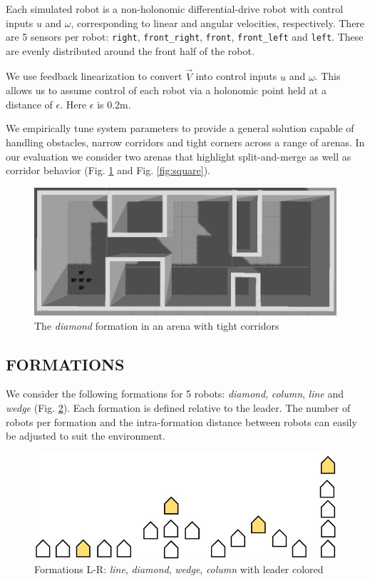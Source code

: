 \documentclass[letterpaper, 10 pt, conference]{ieeeconf}  %
\begin{document}
Each simulated robot is a non-holonomic differential-drive robot with control inputs $u$ and $\omega$, corresponding to linear and angular velocities, respectively. There are 5 sensors per robot: \texttt{right}, \texttt{front\_right}, \texttt{front}, \texttt{front\_left} and \texttt{left}. These are evenly distributed around the front half of the robot.

We use feedback linearization to convert $\vec{V}$ into control inputs $u$ and $\omega$. This allows us to assume control of each robot via a holonomic point held at a distance of $\epsilon$. Here $\epsilon$ is 0.2m.

We empirically tune system parameters to provide a general solution capable of handling obstacles, narrow corridors and tight corners across a range of arenas. In our evaluation we consider two arenas that highlight split-and-merge as well as corridor behavior (Fig. \ref{fig:corridorworld} and Fig. \ref{fig:square}). 

\begin{figure}[thpb]
\centering
\includegraphics[width=\linewidth]{images/corridorworld.png}
\caption{The \textit{diamond} formation in an arena with tight corridors}
\label{fig:corridorworld}
\end{figure}

\subsection{FORMATIONS}

We consider the following formations for 5 robots: \textit{diamond}, \textit{column}, \textit{line} and \textit{wedge} (Fig. \ref{formation_shapes}). Each formation is defined relative to the leader. The number of robots per formation and the intra-formation distance between robots can easily be adjusted to suit the environment.

\begin{figure}[thpb]
\centering
\includegraphics[width=0.7\linewidth]{images/formation_shapes.jpg}
\caption{Formations L-R: \textit{line}, \textit{diamond}, \textit{wedge}, \textit{column} with leader colored}
\label{formation_shapes}
\end{figure}
\end{document}
